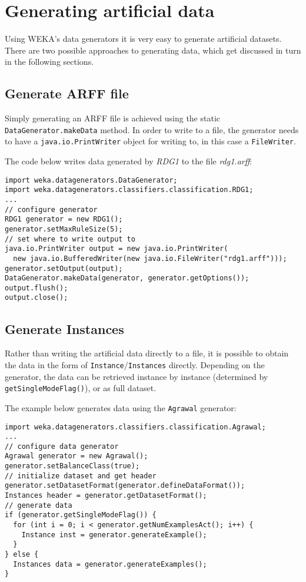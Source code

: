 \newpage
\section{Generating artificial data}
\label{api_artificial_datasets}
Using WEKA's data generators it is very easy to generate artificial datasets. 
There are two possible approaches to generating data, which get discussed in 
turn in the following sections.

\subsection{Generate ARFF file}
Simply generating an ARFF file is achieved using the static \texttt{DataGenerator.makeData}
method. In order to write to a file, the generator needs to have a \texttt{java.io.PrintWriter}
object for writing to, in this case a \texttt{FileWriter}.

The code below writes data generated by \textit{RDG1} to the file \textit{rdg1.arff}:
\begin{verbatim}
import weka.datagenerators.DataGenerator;
import weka.datagenerators.classifiers.classification.RDG1;
...
// configure generator
RDG1 generator = new RDG1();
generator.setMaxRuleSize(5);
// set where to write output to
java.io.PrintWriter output = new java.io.PrintWriter(
  new java.io.BufferedWriter(new java.io.FileWriter("rdg1.arff")));
generator.setOutput(output);
DataGenerator.makeData(generator, generator.getOptions());
output.flush();
output.close();
\end{verbatim}


\subsection{Generate Instances}
Rather than writing the artificial data directly to a file, it is possible to obtain the 
data in the form of \texttt{Instance}/\texttt{Instances} directly. Depending on the 
generator, the data can be retrieved instance by instance (determined by 
\texttt{getSingleModeFlag()}), or as full dataset.

The example below generates data using the \texttt{Agrawal} generator:
\begin{verbatim}
import weka.datagenerators.classifiers.classification.Agrawal;
...
// configure data generator
Agrawal generator = new Agrawal();
generator.setBalanceClass(true);
// initialize dataset and get header
generator.setDatasetFormat(generator.defineDataFormat());
Instances header = generator.getDatasetFormat();
// generate data
if (generator.getSingleModeFlag()) {
  for (int i = 0; i < generator.getNumExamplesAct(); i++) {
    Instance inst = generator.generateExample();
  }
} else {
  Instances data = generator.generateExamples();
}
\end{verbatim}


